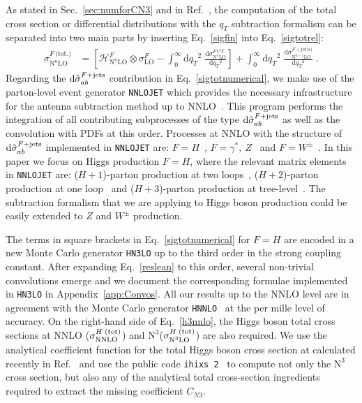 \documentclass[12pt]{article}
\DeclareRobustCommand{\qt}{\ensuremath{q_T}\xspace}
\DeclareRobustCommand{\rd}{\ensuremath{\mathrm{d}}}
\DeclareRobustCommand{\cH}{\ensuremath{\mathcal{H}}}
\DeclareRobustCommand{\jets}{\text{jet(s)}\xspace}
\DeclareRobustCommand{\CT}{\text{CT}\xspace}
\DeclareRobustCommand{\tot}{\text{(tot.)}\xspace}
\DeclareRobustCommand{\LO}{\text{LO}\xspace}
\DeclareRobustCommand{\N}[1]{\ensuremath{\text{N}^{#1}}} %
\begin{document}
As stated in Sec.~\ref{sec:numforCN3} and in Ref.~\cite{Catani:2007vq}, the computation of the total cross section or differential distributions with the  $\qt$ subtraction formalism can be separated into two main parts by inserting Eq.~\eqref{sigfin} into Eq.~\eqref{sigtotrel}:
\begin{align}
  \sigma^{F\,\tot}_{\N{n}\LO}
  &=
  \left[
    \cH^F_{\N{n}\LO} \otimes \sigma^F_{\LO}
    - \int_0^\infty\rd\qt^2 \; \frac{\rd\sigma^{F\,\CT}_{\N{n}\LO}}{\rd\qt^2} 
  \right]
  + \int_0^\infty\rd\qt^2 \; \frac{\rd\sigma^{F+\jets}_{\N{n-1}\LO}}{\rd\qt^2} \;.
  \label{sigtotnumerical} 
\end{align}
Regarding the $\rd{\hat \sigma}_{ab}^{F+{\rm jets}}$ contribution in Eq.~\eqref{sigtotnumerical}, we make use of the parton-level event generator \texttt{NNLOJET} which provides the necessary infrastructure for the antenna subtraction method up to NNLO~\cite{Antenna:method}. This program performs the integration of all contributing subprocesses of the type  $\rd{\hat \sigma}_{ab}^{F+{\rm jets}}$ as well as the convolution with PDFs at this order. Processes at NNLO with the structure of $\rd{\hat \sigma}_{ab}^{F+{\rm jets}}$ implemented in \texttt{NNLOJET} are: $F=H$~\cite{Chen:2016zka}, $F=\gamma^*,~Z$~\cite{Ridder:2015dxa,Gehrmann-DeRidder:2016jns} and $F=W^{\pm}$~\cite{Gehrmann-DeRidder:2017mvr}. In this paper we focus on Higgs production $F=H$, where the relevant matrix elements in 
 \texttt{NNLOJET} are: ($H+1$)-parton production at two loops~\cite{Gehrmann:2011aa}, ($H+2$)-parton production at one loop~\cite{Dixon:2009uk,Badger:2009hw,Badger:2009vh} and ($H+3$)-parton 
 production at tree-level~\cite{DelDuca:2004wt,Dixon:2004za,Badger:2004ty}. The subtraction formalism that we are applying to Higgs boson production could be easily extended  to $Z$ and $W^{\pm}$ production. 

The terms in square brackets in Eq.~\eqref{sigtotnumerical}  for $F=H$ are encoded in a new Monte Carlo generator \texttt{HN3LO} up to the third order in the strong coupling constant. After expanding Eq.~\eqref{reslean} to this order, several non-trivial convolutions emerge and we document the corresponding formulae implemented in \texttt{HN3LO} in Appendix~\ref{app:Convos}. All our results up to the NNLO level are in agreement with the Monte Carlo generator \texttt{HNNLO}~\cite{Catani:2007vq} at the per mille level of accuracy. On the right-hand side of Eq.~\eqref{h3nnlo}, the Higgs boson total cross sections at NNLO ($\sigma^{H\; {\rm (tot)}}_{\rm NNLO}$) and \N3\LO  ($\sigma^{H\; {\rm (tot)}}_{\N{3}\LO}$) are also required. We use the analytical coefficient function for the 
total Higgs boson cross section at calculated recently in Ref.~\cite{Mistlberger:2018etf} and  use the public code \texttt{ihixs 2}~\cite{Dulat:2018rbf} to compute not only the \N3\LO cross section, but also any of the analytical total cross-section ingredients required to extract the missing coefficient $C_{N3}$.
\end{document}
